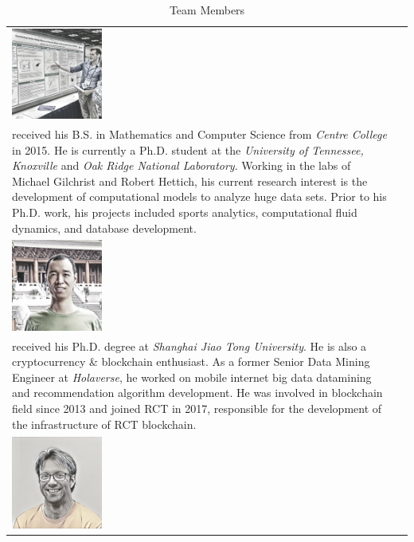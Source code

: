 \documentclass[a4paper,oneside,openany]{tufte-book}
\begin{document}
\begin{table}[ht]
\centering
\caption{Team Members}
\label{my-label}
\begin{tabular}{ l | l }
     \includegraphics[width=30mm]{fig/p2} & \begin{minipage}{40em}
  \emph{Alexander Cope} \\ received his B.S. in Mathematics and Computer Science from \emph{Centre College} in 2015. He is currently a Ph.D. student at the \emph{University of Tennessee, Knoxville} and \emph{Oak Ridge National Laboratory}. Working in the labs of Michael Gilchrist and Robert Hettich, his current research interest is the development of computational models to analyze huge data sets. Prior to his Ph.D. work, his projects included sports analytics, computational fluid dynamics, and database development.
\end{minipage}\\
     \includegraphics[width=30mm]{fig/p4} &\begin{minipage}{40em}
  \emph{Jason Lian} \\ received his Ph.D. degree at \emph{Shanghai Jiao Tong University}. He is also a cryptocurrency \& blockchain enthusiast. As a former Senior Data Mining Engineer at \emph{Holaverse}, he worked on mobile internet big data datamining and recommendation algorithm development. He was involved in blockchain field since 2013 and joined RCT in 2017, responsible for the development of the infrastructure of RCT blockchain.
\end{minipage} \\
      \includegraphics[width=30mm]{fig/p3}     &\begin{minipage}{40em}

\end{minipage}
\end{tabular}
\end{table}
\end{document}
